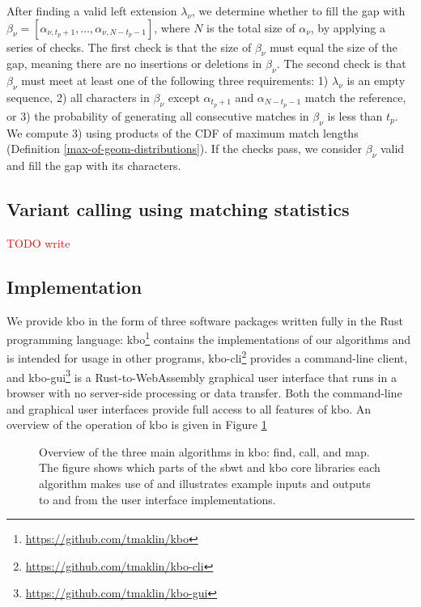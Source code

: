 \documentclass[unnumsec,webpdf,contemporary,large]{oup-authoring-template}%
\theoremstyle{thmstyleone}%
\theoremstyle{thmstyletwo}%
\theoremstyle{thmstylethree}%
\begin{document}
After finding a valid left extension $\lambda_\nu$, we determine whether to fill the gap with $\beta_\nu = \left[\alpha_{\nu,t_p + 1},\dots,\alpha_{\nu,N - t_p - 1}\right]$, where $N$ is the total size of $\alpha_\nu$, by applying a series of checks. The first check is that the size of $\beta_\nu$ must equal the size of the gap, meaning there are no insertions or deletions in $\beta_\nu$. The second check is that $\beta_\nu$ must meet at least one of the following three requirements: 1) $\lambda_\nu$ is an empty sequence, 2) all characters in $\beta_\nu$ except $\alpha_{t_p + 1}$ and $\alpha_{N - t_p - 1}$ match the reference, or 3) the probability of generating all consecutive matches in $\beta_\nu$ is less than $t_p$. We compute 3) using products of the CDF of maximum match lengths (Definition \ref{max-of-geom-distributions}). If the checks pass, we consider $\beta_\nu$ valid and fill the gap with its characters.

\subsection{Variant calling using matching statistics}
\textcolor{red}{TODO write}

\subsection{Implementation}
We provide {\sf kbo} in the form of three software packages written fully in the Rust programming language: kbo\footnote{\url{https://github.com/tmaklin/kbo}} contains the implementations of our algorithms and is intended for usage in other programs, kbo-cli\footnote{\url{https://github.com/tmaklin/kbo-cli}} provides a command-line client, and kbo-gui\footnote{\url{https://github.com/tmaklin/kbo-gui}} is a Rust-to-WebAssembly graphical user interface that runs in a browser with no server-side processing or data transfer. Both the command-line and graphical user interfaces provide full access to all features of {\sf kbo}. An overview of the operation of {\sf kbo} is given in Figure \ref{fig:kbo-overview}

\begin{figure}[!t]%
\centering
{}
\caption{Overview of the three main algorithms in {\sf kbo}: find, call, and map. The figure shows which parts of the sbwt and {\sf kbo} core libraries each algorithm makes use of and illustrates example inputs and outputs to and from the user interface implementations. }\label{fig:kbo-overview}
\end{figure}
\end{document}
